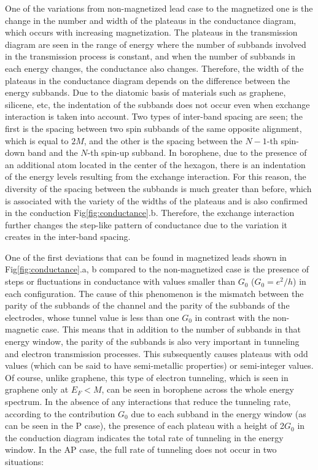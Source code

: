 \documentclass[twoside,twocolumn,9pt]{article}
\begin{document}
One of the variations from non-magnetized lead case to the magnetized one is the change in the number and width of the plateaus in the conductance diagram, which occurs with increasing magnetization. The plateaus in the transmission diagram are seen in the range of energy where the number of subbands involved in the transmission process is constant, and when the number of subbands in each energy changes, the conductance also changes. Therefore, the width of the plateaus in the conductance diagram depends on the difference between the energy subbands. Due to the diatomic basis of materials such as graphene, silicene, etc, the indentation of the subbands does not occur even when exchange interaction is taken into account. Two types of inter-band spacing are seen; the first is the spacing between two spin subbands of the same opposite alignment, which is equal to $2M$, and the other is the spacing between the $N-1$-th spin-down band and the $N$-th spin-up subband. In borophene, due to the presence of an additional atom located in the center of the hexagon, there is an indentation of the energy levels resulting from the exchange interaction. For this reason, the diversity of the spacing between the subbands is much greater than before, which is associated with the variety of the widths of the plateaus and is also confirmed in the conduction Fig\ref{fig:conductance}.b. Therefore, the exchange interaction further changes the step-like pattern of conductance due to the variation it creates in the inter-band spacing.

One of the first deviations that can be found in magnetized leads shown in Fig\ref{fig:conductance}.a, b compared to the non-magnetized case is the presence of steps or fluctuations in conductance with values smaller than $G_0$ ($G_0 = e^2/h$) in each configuration. The cause of this phenomenon is the mismatch between the parity of the subbands of the channel and the parity of the subbands of the electrodes, whose tunnel value is less than one $G_0$ in contrast with the non-magnetic case. This means that in addition to the number of subbands in that energy window, the parity of the subbands is also very important in tunneling and electron transmission processes. This subsequently causes plateaus with odd values (which can be said to have semi-metallic properties) or semi-integer values. Of course, unlike graphene, this type of electron tunneling, which is seen in graphene only at $E_F<M$, can be seen in borophene across the whole energy spectrum. In the absence of any interactions that reduce the tunneling rate, according to the contribution $G_0$ due to each subband in the energy window (as can be seen in the P case), the presence of each plateau with a height of 2$G_0$ in the conduction diagram indicates the total rate of tunneling in the energy window. In the AP case, the full rate of tunneling does not occur in two situations: 
\end{document}
